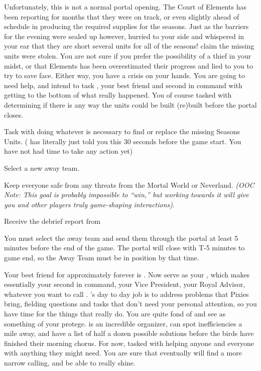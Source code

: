 \documentclass[char]{PP}
\begin{document}
Unfortunately, this is not a normal portal opening. The Court of Elements has been reporting for months that they were on track, or even slightly ahead of schedule in producing the required supplies for the seasons. Just as the barriers for the evening were sealed up however, \cEHead{} hurried to your side and whispered in your ear that they are short several units for all of the seasons! \cEHead{\They} claim\cEHead{\plural} the missing units were stolen. You are not sure if you prefer the possibility of a thief in your midst, or that Elements has been overestimated their progress and lied to you to try to save face. Either way, you have a crisis on your hands. You are going to need help, and intend to task \cSAdvisor{}, your best friend and second in command with getting to the bottom of what really happened. You of course tasked \cEHead{} with determining if there is any way the units could be built (re)built before the portal closes.

\begin{itemz}
	\item Task \cSAdvisor{} with doing whatever is necessary to find or replace the missing Seasons Units. (\cEHead{} has literally just told you this 30 seconds before the game start. You have not had time to take any action yet)
	\item Select a new away team.
	\item Keep everyone safe from any threats from the Mortal World or Neverland. \textit{(OOC Note: This goal is probably impossible to ``win,'' but working towards it will give you and other players truly game-shaping interactions)}.
	\item Receive the debrief report from \cSPM{}
\end{itemz}

\begin{itemz}[Notes]
	\item You must select the away team and send them through the portal at least 5 minutes before the end of the game. The portal will close with T-5 minutes to game end, so the Away Team must be in position by that time.
\end{itemz}

\begin{contacts}
	\contact{\cSAdvisor{}} Your best friend for approximately forever is \cSAdvisor{}. Now \cSAdvisor{\They} serve\cSAdvisor{\plural} as your \cSAdvisor{\Heir}, which makes \cSAdvisor{\them} essentially your second in command, your Vice President, your Royal Advisor, whatever you want to call \cSAdvisor{\them}. \cSAdvisor{}'s day to day job is to address problems that Pixies bring, fielding questions and tasks that don't need your personal attention, so you have time for the things that really do.
	\contact{\cSHelp{}} You are quite fond of \cSHelp{} and see \cSHelp{\them} as something of your protege. \cSHelp{} is an incredible organizer, can spot inefficiencies a mile away, and have a list of half a dozen possible solutions before the birds have finished their morning chorus. For now, \cSHelp{\Theyare} tasked with helping anyone and everyone with anything they might need. You are sure that eventually \cSHelp{} will find a more narrow calling, and be able to really shine.
\end{contacts}
\end{document}
